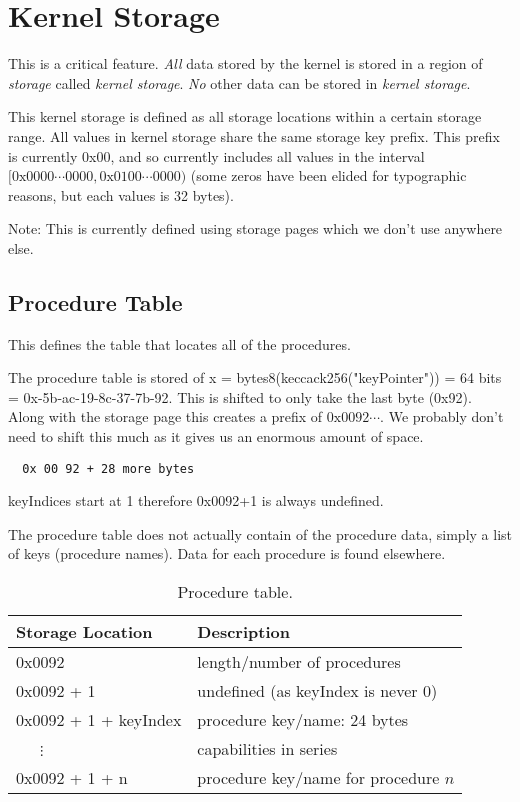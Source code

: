 \documentclass[english,a4paper]{article}
\begin{document}
\section{Kernel Storage}\label{kernel-storage}
This is a critical feature. \emph{All} data stored by the kernel is stored in a
region of \emph{storage} called \emph{kernel storage}. \emph{No} other data can
be stored in \emph{kernel storage}.

This kernel storage is defined as all storage locations within a certain storage
range. All values in kernel storage share the same storage key prefix. This
prefix is currently 0x00, and so currently includes all values in the interval
$[0\text{x}0000 \cdots 0000, 0\text{x}0100 \cdots 0000)$ (some zeros have been
elided for typographic reasons, but each values is 32 bytes).

Note: This is currently defined using storage pages which we don't use anywhere
else.

\subsection{Procedure Table}\label{procedure-table}
This defines the table that locates all of the procedures.

The procedure table is stored of x = bytes8(keccack256("keyPointer")) = 64 bits
= 0x-5b-ac-19-8c-37-7b-92. This is shifted to only take the last byte (0x92).
Along with the storage page this creates a prefix of ${0\text{x} 00 92 \cdots}$.
We probably don't need to shift this much as it gives us an enormous amount of
space.

\begin{verbatim}
  0x 00 92 + 28 more bytes
\end{verbatim}

keyIndices start at 1 therefore 0x0092+1 is always undefined.

The procedure table does not actually contain of the procedure data, simply a
list of keys (procedure names). Data for each procedure is found elsewhere.

\begin{table}[H]
  \caption{Procedure table.}
  \centering{}%
  \begin{tabular}{l|p{}}
    \hline
    Storage Location & Description\tabularnewline
    \hline
    \hline
    0x0092     & length/number of procedures \tabularnewline
    0x0092 + 1 & undefined (as keyIndex is never 0) \tabularnewline
    0x0092 + 1 + keyIndex & procedure key/name: 24 bytes \tabularnewline
    ~~~$\vdots$ & capabilities in series \tabularnewline
    0x0092 + 1 + n & procedure key/name for procedure $n$ \tabularnewline
    \hline
  \end{tabular}
\end{table}
\end{document}
